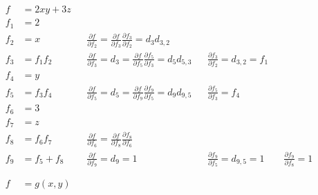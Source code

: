 \documentclass{article}
\begin{document}
\begin{align}
  f &= 2xy + 3z \\
  f_1 &= 2 \\
  f_2 &= x && \frac{\partial f}{\partial f_2} = \frac{\partial f}{\partial f_3} \frac{\partial f_3}{\partial f_2} = d_3 d_{3,2}\\
  f_3 &= f_1 f_2 && \frac{\partial f}{\partial f_3} = d_3 = \frac{\partial f}{\partial f_5} \frac{\partial f_5}{\partial f_3} = d_5 d_{5,3} && \frac{\partial f_3}{\partial f_2} = d_{3,2} = f_1\\
  f_4 &= y \\
  f_5 &= f_3 f_4 && \frac{\partial f}{\partial f_5} = d_5 = \frac{\partial f}{\partial f_9} \frac{\partial f_9}{\partial f_5} = d_9 d_{9,5} && \frac{\partial f_5}{\partial f_3} = f_4\\
  f_6 &= 3\\
  f_7 &= z\\
  f_8 &= f_6 f_7 && \frac{\partial f}{\partial f_6} = \frac{\partial f}{\partial f_8} \frac{\partial f_8}{\partial f_6}\\
  f_9 &= f_5 + f_8 && \frac{\partial f}{\partial f_9} = d_9 = 1 && \frac{\partial f_9}{\partial f_5} = d_{9,5} = 1 && \frac{\partial f_9}{\partial f_8} = 1 \\
  \\
  \\
  f &= g(x,y)
\end{align}
\end{document}
